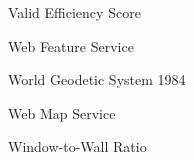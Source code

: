 \begin{description}[style=nextline,leftmargin=3cm,labelwidth=2.5cm]
\item[VES] Valid Efficiency Score

\item[WFS] Web Feature Service
\item[WGS84] World Geodetic System 1984
\item[WMS] Web Map Service
\item[WWR] Window-to-Wall Ratio

\end{description}

